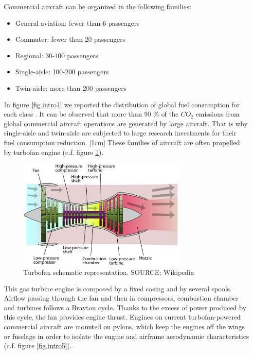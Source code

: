 Commercial aircraft can be organized in the following families:
\begin{itemize}
\item General aviation: fewer than 6 passengers
\item Commuter: fewer than 20 passengers
\item Regional: 30-100 passengers
\item Single-aisle: 100-200 passengers 
\item Twin-aisle: more than 200 passengers
\end{itemize}
In figure \ref{fig.intro1} we reported the distribution of global fuel consumption for each class \cite{yutko2011approaches}. It can be observed that more than 90 $\%$ of the $CO_2$ emissions from global commercial aircraft operations are generated by large aircraft. 
That is why single-aisle and twin-aisle are subjected to large research investments for their fuel consumption reduction.
[1cm]
These families of aircraft are often propelled by turbofan engine (c.f. figure \ref{fig.intro2}).
\begin{figure}[!ht]
\centering   
 \includegraphics[width=0.75\textwidth]{images/intro/Turbofan_operation}
     \caption{Turbofan schematic representation. SOURCE: Wikipedia}
     \label{fig.intro2}
\end{figure}
This gas turbine engine is composed by a fixed casing and by several spools. Airflow passing through the fan and then in compressors, combustion chamber and turbines follows a Brayton cycle. Thanks to the excess of power produced by this cycle, the fan provides engine thrust. 
Engines on current turbofan-powered commercial aircraft are mounted on pylons, which keep the engines off the wings or fuselage in order to isolate the engine and airframe aerodynamic characteristics (c.f. figure \ref{fig.intro5}).
